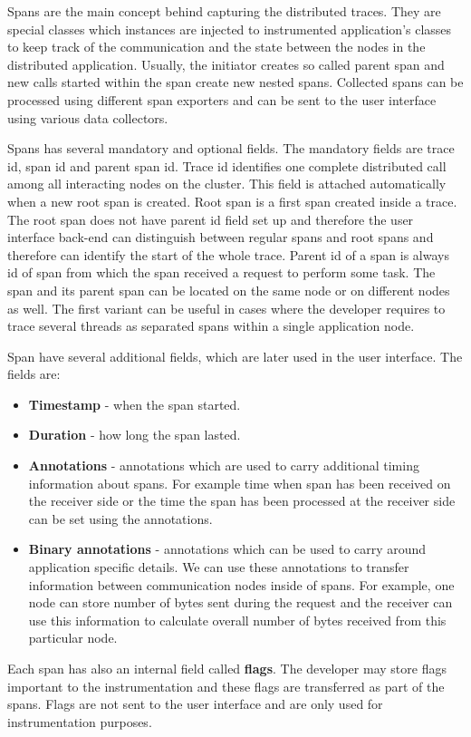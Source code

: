 Spans are the main concept behind capturing the distributed traces. They are special classes which instances are injected to instrumented application's classes to keep track of the communication and the state between the nodes in the distributed application. Usually, the initiator creates so called parent span and new calls started within the span create new nested spans. Collected spans can be processed using different span exporters and can be sent to the user interface using various data collectors.

Spans has several mandatory and optional fields. The mandatory fields are trace id, span id and parent span id. Trace id identifies one complete distributed call among all interacting nodes on the cluster. This field is attached automatically when a new root span is created. Root span is a first span created inside a trace. The root span does not have parent id field set up and therefore the user interface back-end can distinguish between regular spans and root spans and therefore can identify the start of the whole trace. Parent id of a span is always id of span from which the span received a request to perform some task. The span and its parent span can be located on the same node or on different nodes as well. The first variant can be useful in cases where the developer requires to trace several threads as separated spans within a single application node.  

Span have several additional fields, which are later used in the user interface. The fields are:
\begin{itemize}
	\item \textbf{Timestamp} - when the span started.
	\item \textbf{Duration} - how long the span lasted.
	\item \textbf{Annotations} - annotations which are used to carry additional timing information about spans. For example time when span has been received on the receiver side or the time the span has been processed at the receiver side can be set using the annotations.
	\item \textbf{Binary annotations} - annotations which can be used to carry around application specific details. We can use these annotations to transfer information between communication nodes inside of spans. For example, one node can store number of bytes sent during the request and the receiver can use this information to calculate overall number of bytes received from this particular node.
\end{itemize}
Each span has also an internal field called \textbf{flags}. The developer may store flags important to the instrumentation and these flags are transferred as part of the spans. Flags are not sent to the user interface and are only used for instrumentation purposes.

